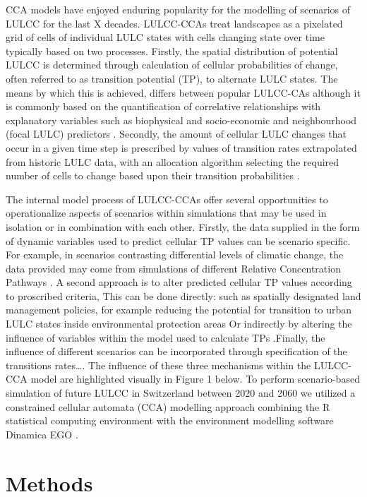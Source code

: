\documentclass[
  authoryear,
  preprint,
  onecolumn]{elsarticle}
\begin{document}
CCA models have enjoyed enduring popularity for the modelling of
scenarios of LULCC for the last X decades. LULCC-CCAs treat landscapes
as a pixelated grid of cells of individual LULC states with cells
changing state over time typically based on two processes. Firstly, the
spatial distribution of potential LULCC is determined through
calculation of cellular probabilities of change, often referred to as
transition potential (TP), to alternate LULC states. The means by which
this is achieved, differs between popular LULCC-CAs although it is
commonly based on the quantification of correlative relationships with
explanatory variables such as biophysical and socio-economic and
neighbourhood (focal LULC) predictors . Secondly, the amount of cellular
LULC changes that occur in a given time step is prescribed by values of
transition rates extrapolated from historic LULC data, with an
allocation algorithm selecting the required number of cells to change
based upon their transition probabilities .

The internal model process of LULCC-CCAs offer several opportunities to
operationalize aspects of scenarios within simulations that may be used
in isolation or in combination with each other. Firstly, the data
supplied in the form of dynamic variables used to predict cellular TP
values can be scenario specific. For example, in scenarios contrasting
differential levels of climatic change, the data provided may come from
simulations of different Relative Concentration Pathways . A second
approach is to alter predicted cellular TP values according to
proscribed criteria, This can be done directly: such as spatially
designated land management policies, for example reducing the potential
for transition to urban LULC states inside environmental protection
areas Or indirectly by altering the influence of variables within the
model used to calculate TPs .Finally, the influence of different
scenarios can be incorporated through specification of the transitions
rates\ldots. The influence of these three mechanisms within the
LULCC-CCA model are highlighted visually in Figure 1 below. To perform
scenario-based simulation of future LULCC in Switzerland between 2020
and 2060 we utilized a constrained cellular automata (CCA) modelling
approach combining the R statistical computing environment with the
environment modelling software Dinamica EGO .

\hypertarget{methods}{%
\section{Methods}\label{methods}}
\end{document}
